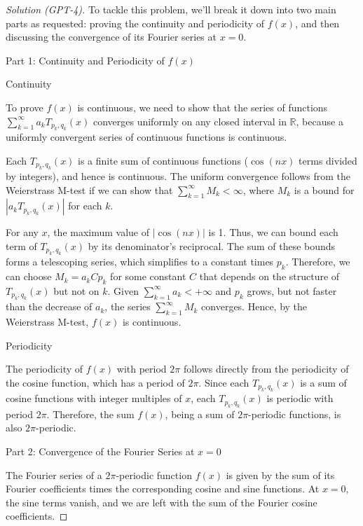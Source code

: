 \documentclass[10pt,a4paper]{amsart}
\begin{document}
\begin{proof}[Solution (GPT-4)]
 To tackle this problem, we'll break it down into two main parts as requested: proving the continuity and periodicity of \(f(x)\), and then discussing the convergence of its Fourier series at \(x = 0\).
  
  Part 1: Continuity and Periodicity of \(f(x)\)
  
  Continuity
  
  To prove \(f(x)\) is continuous, we need to show that the series of functions \(\sum_{k=1}^{\infty} a_k T_{p_k, q_k}(x)\) converges uniformly on any closed interval in \(\mathbb{R}\), because a uniformly convergent series of continuous functions is continuous.
  
  Each \(T_{p_k, q_k}(x)\) is a finite sum of continuous functions (\(\cos(nx)\) terms divided by integers), and hence is continuous. The uniform convergence follows from the Weierstrass M-test if we can show that \(\sum_{k=1}^{\infty} M_k < \infty\), where \(M_k\) is a bound for \(|a_k T_{p_k, q_k}(x)|\) for each \(k\).
  
  For any \(x\), the maximum value of \(|\cos(nx)|\) is 1. Thus, we can bound each term of \(T_{p_k, q_k}(x)\) by its denominator's reciprocal. The sum of these bounds forms a telescoping series, which simplifies to a constant times \(p_k\). Therefore, we can choose \(M_k = a_k C p_k\) for some constant \(C\) that depends on the structure of \(T_{p_k, q_k}(x)\) but not on \(k\). Given \(\sum_{k=1}^{\infty} a_k < +\infty\) and \(p_k\) grows, but not faster than the decrease of \(a_k\), the series \(\sum_{k=1}^{\infty} M_k\) converges. Hence, by the Weierstrass M-test, \(f(x)\) is continuous.
  
 Periodicity
  
  The periodicity of \(f(x)\) with period \(2\pi\) follows directly from the periodicity of the cosine function, which has a period of \(2\pi\). Since each \(T_{p_k, q_k}(x)\) is a sum of cosine functions with integer multiples of \(x\), each \(T_{p_k, q_k}(x)\) is periodic with period \(2\pi\). Therefore, the sum \(f(x)\), being a sum of \(2\pi\)-periodic functions, is also \(2\pi\)-periodic.
  
  Part 2: Convergence of the Fourier Series at \(x = 0\)
  
  The Fourier series of a \(2\pi\)-periodic function \(f(x)\) is given by the sum of its Fourier coefficients times the corresponding cosine and sine functions. At \(x = 0\), the sine terms vanish, and we are left with the sum of the Fourier cosine coefficients.
  

\end{proof}
\end{document}
